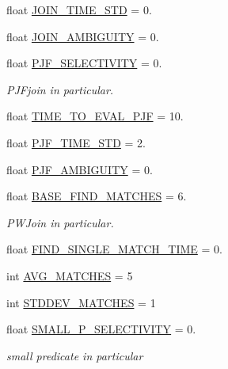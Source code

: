 \begin{DoxyCompactItemize}
float \hyperlink{namespacedynamicfilterapp_1_1toggles_ae502c14d9af3013e7d53270e7d917ddf}{J\+O\+I\+N\+\_\+\+T\+I\+M\+E\+\_\+\+S\+TD} = 0.
\item 
float \hyperlink{namespacedynamicfilterapp_1_1toggles_acc5592b401b58ab4d282529788151e50}{J\+O\+I\+N\+\_\+\+A\+M\+B\+I\+G\+U\+I\+TY} = 0.
\item 
float \hyperlink{namespacedynamicfilterapp_1_1toggles_a1ca6fabc3122c8c7fa3e79743d8b1284}{P\+J\+F\+\_\+\+S\+E\+L\+E\+C\+T\+I\+V\+I\+TY} = 0.
\begin{DoxyCompactList}\small\item\em P\+J\+Fjoin in particular. \end{DoxyCompactList}\item 
float \hyperlink{namespacedynamicfilterapp_1_1toggles_aaa6b9c0193fd0df4a455732260a25296}{T\+I\+M\+E\+\_\+\+T\+O\+\_\+\+E\+V\+A\+L\+\_\+\+P\+JF} = 10.
\item 
float \hyperlink{namespacedynamicfilterapp_1_1toggles_aad16c427ff3264dff2ae020880e37fcf}{P\+J\+F\+\_\+\+T\+I\+M\+E\+\_\+\+S\+TD} = 2.
\item 
float \hyperlink{namespacedynamicfilterapp_1_1toggles_ac26d44f0e7f72ea9c97da03213497593}{P\+J\+F\+\_\+\+A\+M\+B\+I\+G\+U\+I\+TY} = 0.
\item 
float \hyperlink{namespacedynamicfilterapp_1_1toggles_a94a5d45581d82aff264727a66e113b1c}{B\+A\+S\+E\+\_\+\+F\+I\+N\+D\+\_\+\+M\+A\+T\+C\+H\+ES} = 6.
\begin{DoxyCompactList}\small\item\em P\+W\+Join in particular. \end{DoxyCompactList}\item 
float \hyperlink{namespacedynamicfilterapp_1_1toggles_ac7deeef7c5d246e8b7ad68bb3303369a}{F\+I\+N\+D\+\_\+\+S\+I\+N\+G\+L\+E\+\_\+\+M\+A\+T\+C\+H\+\_\+\+T\+I\+ME} = 0.
\item 
int \hyperlink{namespacedynamicfilterapp_1_1toggles_ab0b97a3743ae942843018e2b8ef2774c}{A\+V\+G\+\_\+\+M\+A\+T\+C\+H\+ES} = 5
\item 
int \hyperlink{namespacedynamicfilterapp_1_1toggles_ad6320ebb63e96c487bc89658c619eaf2}{S\+T\+D\+D\+E\+V\+\_\+\+M\+A\+T\+C\+H\+ES} = 1
\item 
float \hyperlink{namespacedynamicfilterapp_1_1toggles_a2ed0ddc00a45fccab5453503c7bd8152}{S\+M\+A\+L\+L\+\_\+\+P\+\_\+\+S\+E\+L\+E\+C\+T\+I\+V\+I\+TY} = 0.
\begin{DoxyCompactList}\small\item\em small predicate in particular \end{DoxyCompactList}\item 

\end{DoxyCompactItemize}
